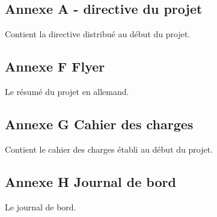 \documentclass[12pt,a4paper,twoside]{report}
\begin{document}
\subsection{Annexe A - directive du projet}
Contient la directive distribué au début du projet.
\subsection {Annexe F \- Flyer}
Le résumé du projet en allemand.
\subsection {Annexe G \- Cahier des charges}
Contient le cahier des charges établi au début du projet.
\subsection {Annexe H \- Journal de bord}
Le journal de bord.
\end{document}
